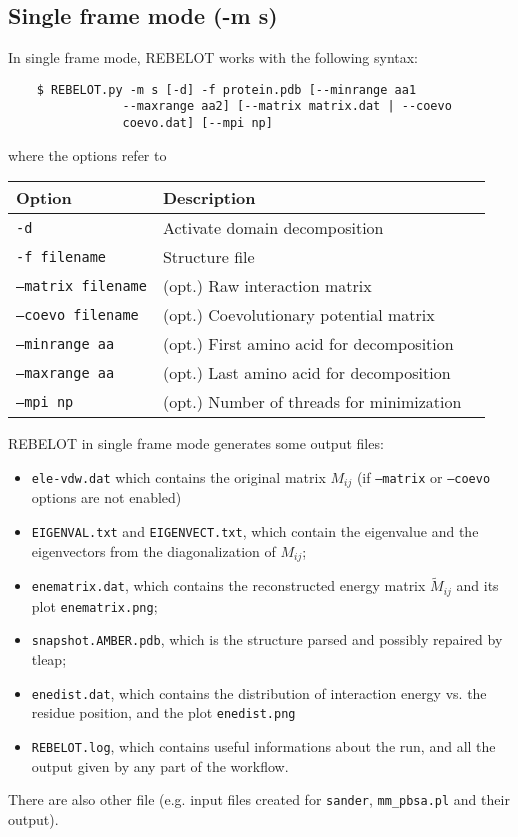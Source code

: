 \documentclass[a4paper,12pt]{book}
\begin{document}
\subsection{Single frame mode (-m s)}
\label{sec31:single}
In single frame mode, REBELOT works with the following syntax:
\begin{lstlisting}
	$ REBELOT.py -m s [-d] -f protein.pdb [--minrange aa1 
				--maxrange aa2] [--matrix matrix.dat | --coevo 
				coevo.dat] [--mpi np]
\end{lstlisting}
where the options refer to
\begin{center}
\begin{tabular}{lll}
\toprule
Option & Description\\
\midrule
\texttt{-d}  & Activate domain decomposition \\
\texttt{-f filename}   & Structure file \\
\texttt{--matrix filename} &(opt.) Raw interaction matrix \\
\texttt{--coevo filename} &(opt.) Coevolutionary potential matrix \\
\texttt{--minrange aa}  & (opt.) First amino acid for decomposition \\
\texttt{--maxrange aa}  & (opt.) Last amino acid for decomposition \\
\texttt{--mpi np}  & (opt.) Number of threads for minimization \\
\bottomrule
\end{tabular}
\end{center}
REBELOT in single frame mode generates some output files:
\begin{itemize}
	\item \texttt{ele-vdw.dat} which contains the original matrix $M_{ij}$ (if \texttt{--matrix} or \texttt{--coevo} options are not enabled)
	\item \texttt{EIGENVAL.txt} and \texttt{EIGENVECT.txt}, which contain the eigenvalue and the eigenvectors from the diagonalization of $M_{ij}$;
	\item \texttt{enematrix.dat}, which contains the reconstructed energy matrix $\tilde{M}_{ij}$ and its plot \texttt{enematrix.png};
	\item \texttt{snapshot.AMBER.pdb}, which is the structure parsed and possibly repaired by tleap;
	\item \texttt{enedist.dat}, which contains the distribution of interaction energy vs. the residue position, and the plot \texttt{enedist.png}
	\item \texttt{REBELOT.log}, which contains useful informations about the run, and all the output given by any part of the workflow.
\end{itemize}
There are also other file (e.g. input files created for \texttt{sander}, \texttt{mm\_pbsa.pl} and their output).
\end{document}
